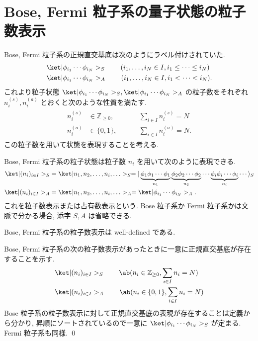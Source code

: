 \documentclass[uplatex,dvipdfmx,a4paper,11pt]{jlreq}
\makeatletter
\newcommand{\ZZ}{\mathbb{Z}}
\numberwithin{equation}{section}
\theoremstyle{definition}
\renewenvironment{proof}[1][\proofname]{\par
  \normalfont
  \topsep6\p@\@plus6\p@ \trivlist
  \item[\hskip\labelsep{\bfseries #1}\@addpunct{\bfseries}]\ignorespaces\quad\par
}{%
  \qed\endtrivlist\@endpefalse
}
\renewcommand\proofname{証明}
\makeatother
\begin{document}
\section{Bose, Fermi 粒子系の量子状態の粒子数表示}
Bose, Fermi 粒子系の正規直交基底は次のようにラベル付けされていた.
\begin{align}
   & \ket|\phi_{i_1}\cdots\phi_{i_N}>_S \qquad (i_1,\ldots,i_N\in I, i_1\leq\cdots\leq i_N) \\
   & \ket|\phi_{i_1}\cdots\phi_{i_N}>_A \qquad (i_1,\ldots,i_N\in I, i_1<\cdots<i_{N}).
\end{align}
これより粒子状態 $\ket|\phi_{i_1}\cdots\phi_{i_N}>_S, \ket|\phi_{i_1}\cdots\phi_{i_N}>_A$ の粒子数をそれぞれ $n_i^{(s)}, n_i^{(a)}$ とおくと次のような性質を満たす.
\begin{align}
  \begin{alignedat}{3}
    n_i^{(s)} & \in \ZZ_{\geq 0}, \qquad && \sum_{i\in I}n_i^{(s)} = N \\
    n_i^{(a)} & \in\{0, 1\}, && \sum_{i\in I}n_i^{(a)} = N.
  \end{alignedat}
\end{align}
この粒子数を用いて状態を表現することを考える.
\begin{definition}
  Bose, Fermi 粒子系の粒子状態は粒子数 $n_i$ を用いて次のように表現できる.
  \begin{align}
    \ket|(n_i)_{i\in I}>_S & = \ket|n_1,n_2,\ldots,n_i,\ldots>_S = |\underbrace{\phi_1\phi_1\cdots\phi_1}_{n_1}\underbrace{\phi_2\phi_2\cdots\phi_2}_{n_2}\cdots\underbrace{\phi_i\phi_i\cdots\phi_i}_{n_i}\cdots\rangle_S \\
    \ket|(n_i)_{i\in I}>_A & = \ket|n_1,n_2,\ldots,n_i,\ldots>_A = \ket|\phi_{i_1}\cdots\phi_{i_N}>_A.
  \end{align}
  これを粒子数表示または占有数表示という. Bose 粒子系か Fermi 粒子系かは文脈で分かる場合, 添字 $S, A$ は省略できる.
\end{definition}
\begin{proposition}
  Bose, Fermi 粒子系の粒子数表示は well-defined である.
  \label{particles well defined}
\end{proposition}
\begin{proof}
  Bose, Fermi 粒子系の次の粒子数表示があったときに一意に正規直交基底が存在することを示す.
  \begin{align}
     & \ket|(n_i)_{i\in I}>_S \qquad \ab(n_i\in\ZZ_{\geq 0}, \sum_{i\in I}n_i = N) \\
     & \ket|(n_i)_{i\in I}>_A \qquad \ab(n_i\in\{0, 1\}, \sum_{i\in I}n_i = N)
  \end{align}
  Bose 粒子系の粒子数表示に対して正規直交基底の表現が存在することは定義から分かり, 昇順にソートされているので一意に $\ket|\phi_{i_1}\cdots\phi_{i_N}>_S$ が定まる. Fermi 粒子系も同様.
\end{proof}
\end{document}
